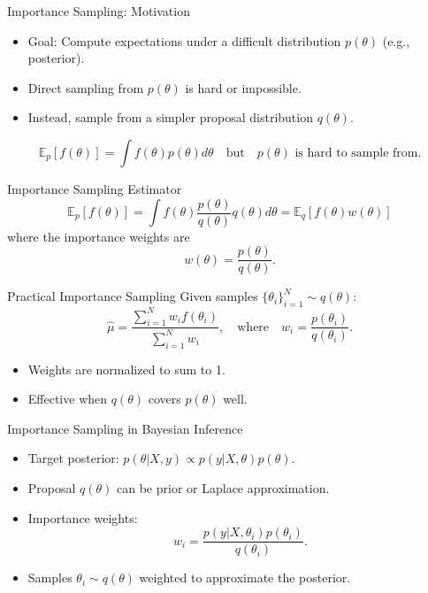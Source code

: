 \documentclass{beamer}
\begin{document}
\begin{frame}{Importance Sampling: Motivation}
\begin{itemize}
    \item Goal: Compute expectations under a difficult distribution \( p(\theta) \) (e.g., posterior).
    \item Direct sampling from \( p(\theta) \) is hard or impossible.
    \item Instead, sample from a simpler proposal distribution \( q(\theta) \).
\end{itemize}
\[
\mathbb{E}_{p}[f(\theta)] = \int f(\theta) p(\theta) d\theta \quad \text{but} \quad p(\theta) \text{ is hard to sample from}.
\]
\end{frame}

\begin{frame}{Importance Sampling Estimator}
\[
\mathbb{E}_{p}[f(\theta)] = \int f(\theta) \frac{p(\theta)}{q(\theta)} q(\theta) d\theta = \mathbb{E}_{q}\left[f(\theta) w(\theta)\right]
\]
where the \alert{importance weights} are
\[
w(\theta) = \frac{p(\theta)}{q(\theta)}.
\]
\end{frame}

\begin{frame}{Practical Importance Sampling}
Given samples \(\{\theta_i\}_{i=1}^N \sim q(\theta)\):
\[
\hat{\mu} = \frac{\sum_{i=1}^N w_i f(\theta_i)}{\sum_{i=1}^N w_i}, \quad \text{where} \quad w_i = \frac{p(\theta_i)}{q(\theta_i)}.
\]
\begin{itemize}
    \item Weights are normalized to sum to 1.
    \item Effective when \( q(\theta) \) covers \( p(\theta) \) well.
\end{itemize}
\end{frame}

\begin{frame}{Importance Sampling in Bayesian Inference}
\begin{itemize}
    \item Target posterior: \( p(\theta | X, y) \propto p(y | X, \theta) p(\theta) \).
    \item Proposal \( q(\theta) \) can be prior or Laplace approximation.
    \item Importance weights:
\[
w_i = \frac{p(y | X, \theta_i) p(\theta_i)}{q(\theta_i)}.
\]
    \item Samples \(\theta_i \sim q(\theta)\) weighted to approximate the posterior.
\end{itemize}
\end{frame}
\end{document}
